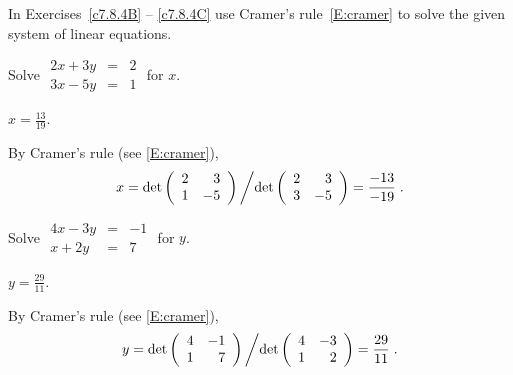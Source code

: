 \documentclass{ximera}
\begin{document}
\noindent In Exercises~\ref{c7.8.4B} -- \ref{c7.8.4C} use Cramer's 
rule~\eqref{E:cramer} to solve the given system of linear 
equations.
\begin{exercise} \label{c7.8.4B}
Solve \qquad $\begin{array}{rcl} 2x+3y & = & 2 \\ 3x - 5y & = & 1 \end{array}$ 
\qquad for $x$.

\begin{solution}
\ans  $x=\frac{13}{19}$.

\soln By Cramer's rule (see \eqref{E:cramer}),
\[
x = \det\left(\begin{array}{rr} 2 & 3\\ 1 &-5\end{array}\right)\left/\det\left(\begin{array}{rr} 2 & 3\\ 3 &-5\end{array}\right)=\frac{-13}{-19}\right..
\]
 

\end{solution}
\end{exercise} 
\begin{exercise} \label{c7.8.4C}
Solve \qquad
$\begin{array}{rcl} 4x-3y & = & -1 \\ x + 2y & = & 7 \end{array}$ 
\qquad for $y$.

\begin{solution}
\ans  $y=\frac{29}{11}$.

\soln By Cramer's rule (see \eqref{E:cramer}),
\[
y = \det\left(\begin{array}{rr} 4 & -1\\ 1 &7\end{array}\right)\left/\det\left(\begin{array}{rr} 4 & -3\\ 1 &2\end{array}\right)=\frac{29}{11}\right..
\]

\end{solution}
\end{exercise}
\end{document}
